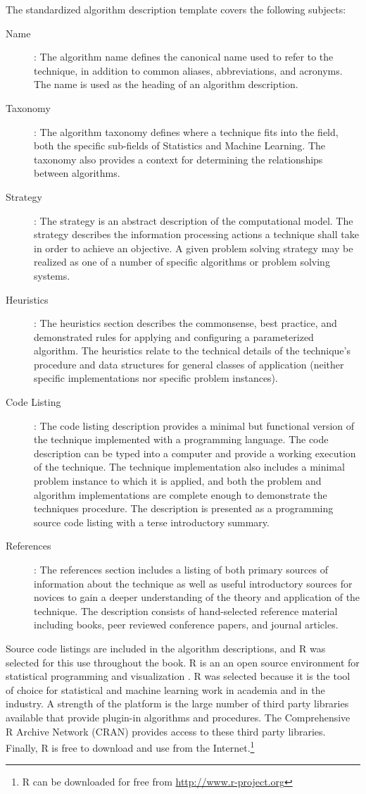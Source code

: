 The standardized algorithm description template covers the following subjects:
\begin{description}
	\item[Name]: The algorithm name defines the canonical name used to refer to the technique, in addition to common aliases, abbreviations, and acronyms. The name is used as the heading of an algorithm description.
	\item[Taxonomy]: The algorithm taxonomy defines where a technique fits into the field, both the specific sub-fields of Statistics and Machine Learning. The taxonomy also provides a context for determining the relationships between algorithms.
	\item[Strategy]: The strategy is an abstract description of the computational model. The strategy describes the information processing actions a technique shall take in order to achieve an objective. A given problem solving strategy may be realized as one of a number of specific algorithms or problem solving systems.
	\item[Heuristics]: The heuristics section describes the commonsense, best practice, and demonstrated rules for applying and configuring a parameterized algorithm. The heuristics relate to the technical details of the technique's procedure and data structures for general classes of application (neither specific implementations nor specific problem instances).
	\item[Code Listing]: The code listing description provides a minimal but functional version of the technique implemented with a programming language. The code description can be typed into a computer and provide a working execution of the technique. The technique implementation also includes a minimal problem instance to which it is applied, and both the problem and algorithm implementations are complete enough to demonstrate the techniques procedure. The description is presented as a programming source code listing with a terse introductory summary.
	\item[References]: The references section includes a listing of both primary sources of information about the technique as well as useful introductory sources for novices to gain a deeper understanding of the theory and application of the technique. The description consists of hand-selected reference material including books, peer reviewed conference papers, and journal articles.
\end{description}


Source code listings are included in the algorithm descriptions, and R was selected for this use throughout the book. R is an an open source environment for statistical programming and visualization \cite{RDCT2011}. R was selected because it is the tool of choice for statistical and machine learning work in academia and in the industry. A strength of the platform is the large number of third party libraries available that provide plugin-in algorithms and procedures. The Comprehensive R Archive Network (CRAN) provides access to these third party libraries. Finally, R is free to download and use from the Internet.\footnote{R can be downloaded for free from \url{http://www.r-project.org}}

